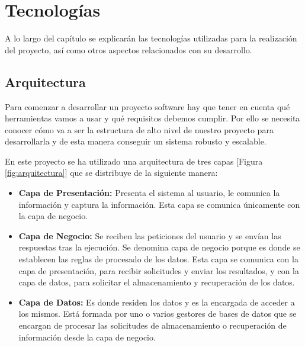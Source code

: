 \chapter{Tecnologías}
\label{chap:tecnologias}
A lo largo del capítulo se explicarán las tecnologías utilizadas para la realización del proyecto, así como otros aspectos relacionados con su desarrollo.

\section{Arquitectura}

Para comenzar a desarrollar un proyecto software hay que tener en cuenta qué herramientas vamos a usar y qué requisitos debemos cumplir. Por ello se necesita conocer cómo va a ser la estructura de alto nivel de nuestro proyecto para desarrollarla y de esta manera conseguir un sistema robusto y escalable. 

En este proyecto se ha utilizado una arquitectura de tres capas [Figura \ref{fig:arquitectura}] que se distribuye de la siguiente manera:

\begin{itemize}
    \item \textbf{Capa de Presentación:}  Presenta el sistema al usuario, le comunica la información y captura la información. Esta capa se comunica únicamente con la capa de negocio.    
    \item \textbf{Capa de Negocio:} Se reciben las peticiones del usuario y se envían las respuestas tras la ejecución. Se denomina capa de negocio porque es donde se establecen las reglas de procesado de los datos. Esta capa se comunica con la capa de presentación, para recibir solicitudes y enviar los resultados, y con la capa de datos, para solicitar el almacenamiento y recuperación de los datos.
    
    \item \textbf{Capa de Datos:}  Es donde residen los datos y es la encargada de acceder a los mismos. Está formada por uno o varios gestores de bases de datos que se encargan de procesar las solicitudes de almacenamiento o recuperación de información desde la capa de negocio.

\end{itemize}

